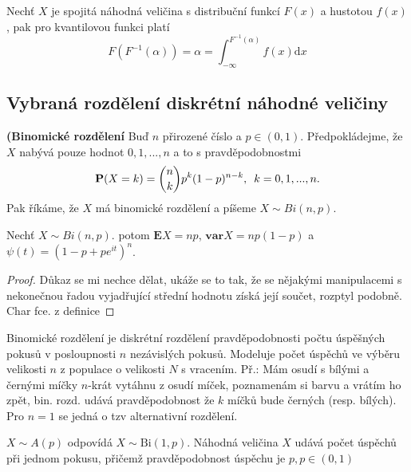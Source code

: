 \begin{notes}
Nechť $X$ je spojitá náhodná veličina s distribuční funkcí $F(x)$ a hustotou $f(x)$, pak pro kvantilovou funkci platí\begin{equation}
F(F^{-1}(\alpha))=\alpha=\int_{-\infty}^{F^{-1}(\alpha)}f(x)\mathrm{d}x
\end{equation}
\end{notes}

\subsection{Vybraná rozdělení diskrétní náhodné veličiny}
\begin{definition}{\textbf{(Binomické rozdělení}}
Buď $n$ přirozené číslo a $p \in (0, 1)$. Předpokládejme, že $X$ nabývá pouze hodnot $0, 1, ..., n$ a to s pravděpodobnostmi
\begin{equation}
\textbf{P}(X = k) = \binom{n}{k}p^{k}(1-p)^{n-k}, \enskip k = 0, 1, ..., n.
\end{equation}
Pak říkáme, že $X$ má binomické rozdělení a píšeme $X \sim Bi(n,p)$.
\end{definition}
\begin{proposition}
Nechť  $X \sim Bi(n,p)$. potom $\mathbf{E}X = np$, $\mathbf{var}X = np(1-p)$ a $\psi(t) = (1-p + pe^{it})^{n}$.
\end{proposition}
\begin{proof}
Důkaz se mi nechce dělat, ukáže se to tak, že se nějakými manipulacemi s nekonečnou řadou vyjadřující střední hodnotu získá její součet, rozptyl podobně. Char fce. z definice
\end{proof}

\begin{remark}
Binomické rozdělení je diskrétní rozdělení pravděpodobnosti počtu úspěšných pokusů v posloupnosti $n$ nezávislých pokusů.
Modeluje počet úspěchů ve výběru velikosti $n$ z populace o velikosti $N$ s vracením. Př.: Mám osudí s bílými a černými míčky $n$-krát vytáhnu z osudí míček, poznamenám si barvu a vrátím ho zpět, bin. rozd. udává pravděpodobnost že $k$ míčků bude černých (resp. bílých). Pro $n = 1$ se jedná o tzv alternativní rozdělení.
\end{remark}
\begin{definition}
$X \sim A(p)$ odpovídá $X\sim \mathrm{Bi}(1,p)$. Náhodná veličina $X$ udává počet úspěchů při jednom pokusu, přičemž pravděpodobnost úspěchu je $p, p\in (0,1)$
\end{definition}

